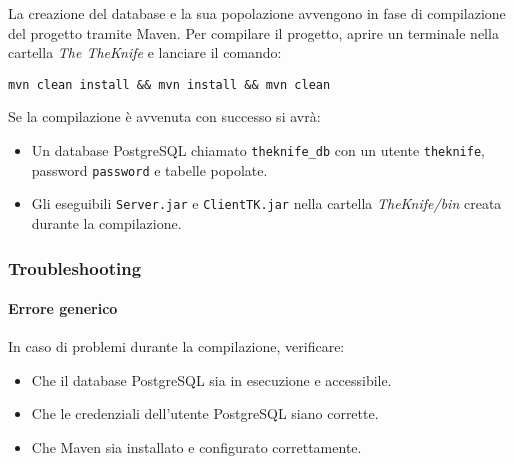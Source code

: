 La creazione del database e la sua popolazione avvengono in fase di 
compilazione del progetto tramite Maven.
Per compilare il progetto, aprire un terminale nella cartella 
\textit{The TheKnife} e lanciare il comando:
\begin{verbatim}
mvn clean install && mvn install && mvn clean
\end{verbatim}
Se la compilazione è avvenuta con successo si avrà:
\begin{itemize}
    \item Un database PostgreSQL chiamato \texttt{theknife\_db} 
    con un utente \texttt{theknife}, password \texttt{password} 
    e tabelle popolate.
    \item Gli eseguibili \texttt{Server.jar} e \texttt{ClientTK.jar} 
    nella cartella \textit{TheKnife/bin} creata durante la compilazione.
\end{itemize}

\subsubsection{Troubleshooting}
\paragraph{Errore generico}
In caso di problemi durante la compilazione, verificare:
\begin{itemize}
    \item Che il database PostgreSQL sia in esecuzione e accessibile.
    \item Che le credenziali dell'utente PostgreSQL siano corrette.
    \item Che Maven sia installato e configurato correttamente.
\end{itemize}
